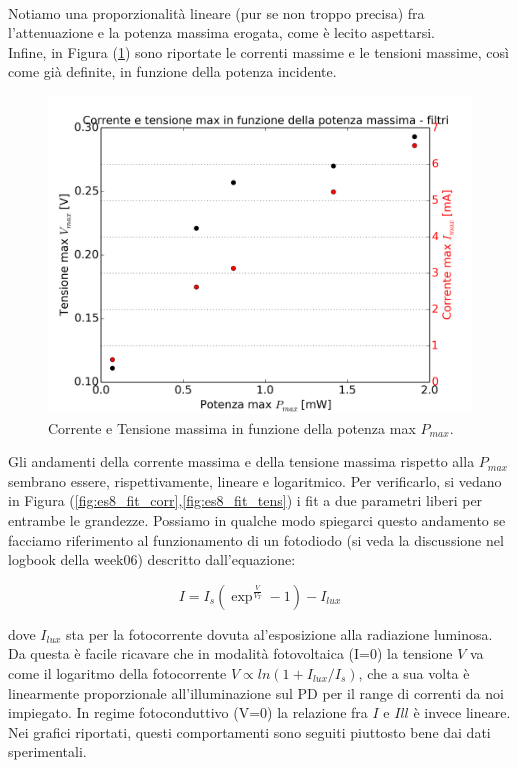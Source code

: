 \documentclass[journal, a4paper]{IEEEtran}
\begin{document}
~\\
Notiamo una proporzionalità lineare (pur se non troppo precisa) fra l'attenuazione e la potenza massima erogata, come è lecito aspettarsi.\\
Infine, in Figura (\ref{fig:es_8_multi}) sono riportate le correnti massime e le tensioni massime, così come già definite, in funzione della potenza incidente. %

\begin{figure}
\centering
\includegraphics[width=0.9\linewidth]{./es_8_multi}
\caption{Corrente e Tensione massima in funzione della potenza max $P_{max}$.}
\label{fig:es_8_multi}
\end{figure}

Gli andamenti della corrente massima e della tensione massima rispetto alla $P_{max}$ sembrano essere, rispettivamente, lineare e logaritmico. Per verificarlo, si vedano in Figura (\ref{fig:es8_fit_corr},\ref{fig:es8_fit_tens}) i fit a due parametri liberi per entrambe le grandezze. Possiamo in qualche modo spiegarci questo andamento se facciamo riferimento al funzionamento di un fotodiodo (si veda la discussione nel logbook della week06) descritto dall'equazione:

\begin{equation}
I = I_s (\exp ^{\frac{V}{V_T}}-1)-I_{lux}
\end{equation}

dove $I_{lux}$ sta per la fotocorrente dovuta al'esposizione alla radiazione luminosa. Da questa è facile ricavare che in modalità fotovoltaica (I=0) la tensione $V$ va come il logaritmo della fotocorrente $V \propto ln(1+I_{lux}/I_s)$, che a sua volta è linearmente proporzionale all'illuminazione sul PD per il range di correnti da noi impiegato. In regime fotoconduttivo (V=0) la relazione fra $I$ e $Ill$ è invece lineare. Nei grafici riportati, questi comportamenti sono seguiti piuttosto bene dai dati sperimentali. 
\end{document}
